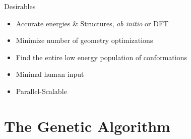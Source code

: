 \documentclass[10pt]{beamer}
\begin{document}
\begin{frame}{Desirables}
	\begin{itemize}[<+->]
		\item Accurate energies \& Structures, \emph{ab initio} or DFT
		\item {Minimize number of geometry optimizations}
		\item {Find the entire low energy population of conformations}
		\item {Minimal human input}
		\item {Parallel-Scalable}
	\end{itemize}	
\end{frame}

\section{The Genetic Algorithm}
\end{document}
